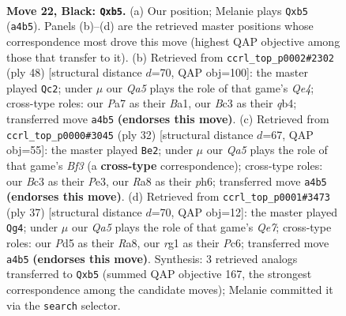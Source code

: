 \documentclass[11pt]{article}
\begin{document}
\clearpage

\begin{figure}[p]\centering
\begin{subfigure}{0.46\textwidth}\centering
\resizebox{\linewidth}{!}{%
\newchessgame
\chessboard[
  setfen={r4rk1/p4p1p/4p3/pP1p2P1/q2P1QP1/2b4P/2P5/3K2RR b - - 1 22},
  showmover=false,
  pgfstyle=straightmove, color=movearrow, markmove={a4-b5}
]}
\caption{}
\end{subfigure}\hfill
\begin{subfigure}{0.46\textwidth}\centering
\resizebox{\linewidth}{!}{%
\newchessgame
\chessboard[
  setfen={4r1k1/pp2ppb1/2pr3p/8/1qPPQ3/6P1/P3PP2/B1RR2K1 w - - 1 25},
  showmover=false,
  pgfstyle=straightmove, color=movearrow, markmove={e4-c2}
]}
\caption{}
\end{subfigure}
\\[4pt]
\begin{subfigure}{0.46\textwidth}\centering
\resizebox{\linewidth}{!}{%
\newchessgame
\chessboard[
  setfen={r1br2k1/p4pp1/1p1q3p/3p4/3P4/1Q2PB1P/P4PP1/R4RK1 w - - 0 17},
  showmover=false,
  pgfstyle=straightmove, color=movearrow, markmove={f3-e2}
]}
\caption{}
\end{subfigure}\hfill
\begin{subfigure}{0.46\textwidth}\centering
\resizebox{\linewidth}{!}{%
\newchessgame
\chessboard[
  setfen={r4rk1/p4ppp/2p1p3/2p5/2P2P2/1PQ5/4qPPP/R3R1K1 b - - 3 19},
  showmover=false,
  pgfstyle=straightmove, color=movearrow, markmove={e2-g4}
]}
\caption{}
\end{subfigure}
\caption{\textbf{Move 22, Black: \texttt{Qxb5}.} (a) Our position; Melanie plays \texttt{Qxb5} (\texttt{a4b5}). Panels (b)--(d) are the retrieved master positions whose correspondence most drove this move (highest QAP objective among those that transfer to it). (b) Retrieved from \texttt{ccrl\_top\_p0002\#2302} (ply 48) [structural distance $d$=70, QAP obj=100]: the master played \texttt{Qc2}; under $\mu$ our \emph{Qa5} plays the role of that game's \emph{Qe4}; cross-type roles: our \emph{P}a7 as their \emph{B}a1, our \emph{B}c3 as their \emph{q}b4; transferred move \texttt{a4b5} \textbf{(endorses this move)}. (c) Retrieved from \texttt{ccrl\_top\_p0000\#3045} (ply 32) [structural distance $d$=67, QAP obj=55]: the master played \texttt{Be2}; under $\mu$ our \emph{Qa5} plays the role of that game's \emph{Bf3} (a \textbf{cross-type} correspondence); cross-type roles: our \emph{B}c3 as their \emph{P}e3, our \emph{R}a8 as their \emph{p}h6; transferred move \texttt{a4b5} \textbf{(endorses this move)}. (d) Retrieved from \texttt{ccrl\_top\_p0001\#3473} (ply 37) [structural distance $d$=70, QAP obj=12]: the master played \texttt{Qg4}; under $\mu$ our \emph{Qa5} plays the role of that game's \emph{Qe7}; cross-type roles: our \emph{P}d5 as their \emph{R}a8, our \emph{r}g1 as their \emph{P}c6; transferred move \texttt{a4b5} \textbf{(endorses this move)}. Synthesis: 3 retrieved analogs transferred to \texttt{Qxb5} (summed QAP objective 167, the strongest correspondence among the candidate moves); Melanie committed it via the \texttt{search} selector.}
\label{fig:thought-m43}
\end{figure}
\end{document}
